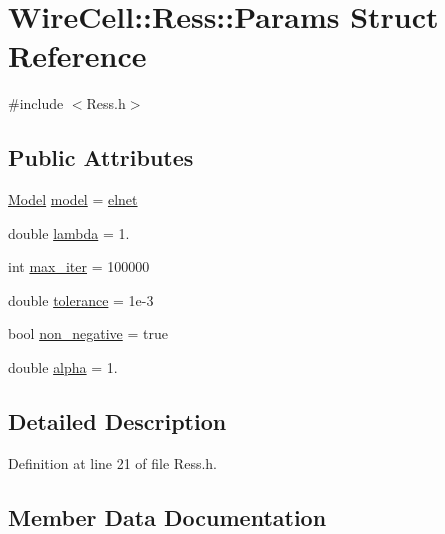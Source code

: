 \hypertarget{struct_wire_cell_1_1_ress_1_1_params}{}\section{Wire\+Cell\+:\+:Ress\+:\+:Params Struct Reference}
\label{struct_wire_cell_1_1_ress_1_1_params}


{\ttfamily \#include $<$Ress.\+h$>$}

\subsection*{Public Attributes}
\begin{DoxyCompactItemize}
\item 
\hyperlink{namespace_wire_cell_1_1_ress_abca29d9a906e0f4e9be142ff3b3b3573}{Model} \hyperlink{struct_wire_cell_1_1_ress_1_1_params_afa3d8d7b22586f2e7deb9bc74e06ecbe}{model} = \hyperlink{namespace_wire_cell_1_1_ress_abca29d9a906e0f4e9be142ff3b3b3573a2b1f23a7622c659094509e0bb0843d86}{elnet}
\item 
double \hyperlink{struct_wire_cell_1_1_ress_1_1_params_a40cb73924fd9380e75e59da9ba1f8483}{lambda} = 1.
\item 
int \hyperlink{struct_wire_cell_1_1_ress_1_1_params_a5a79eae5c66b7dc8ad2e5a5115990248}{max\+\_\+iter} = 100000
\item 
double \hyperlink{struct_wire_cell_1_1_ress_1_1_params_a11b1fc66a53427fd673879f23bb2e768}{tolerance} = 1e-\/3
\item 
bool \hyperlink{struct_wire_cell_1_1_ress_1_1_params_a7673375108a8c7a562274511cf56fd24}{non\+\_\+negative} = true
\item 
double \hyperlink{struct_wire_cell_1_1_ress_1_1_params_ab6ea331c8df8af935c3595f17cb6b20d}{alpha} = 1.
\end{DoxyCompactItemize}


\subsection{Detailed Description}


Definition at line 21 of file Ress.\+h.



\subsection{Member Data Documentation}
\mbox{\label{struct_wire_cell_1_1_ress_1_1_params_ab6ea331c8df8af935c3595f17cb6b20d}} 
